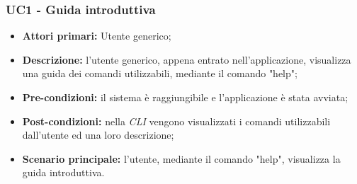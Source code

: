 \subsubsection{UC1 - Guida introduttiva}
\begin{itemize}
	\item \textbf{Attori primari:} Utente generico;
	\item \textbf{Descrizione:} l'utente generico, appena entrato nell'applicazione, visualizza una guida dei comandi utilizzabili, mediante il comando "help"; 
	\item \textbf{Pre-condizioni:} il sistema è raggiungibile e l'applicazione è stata avviata;
	\item \textbf{Post-condizioni:} nella \textit{CLI\glo} vengono visualizzati i comandi utilizzabili dall'utente ed una loro descrizione;
	\item \textbf{Scenario principale:} l'utente, mediante il comando "help", visualizza la guida introduttiva.
\end{itemize}